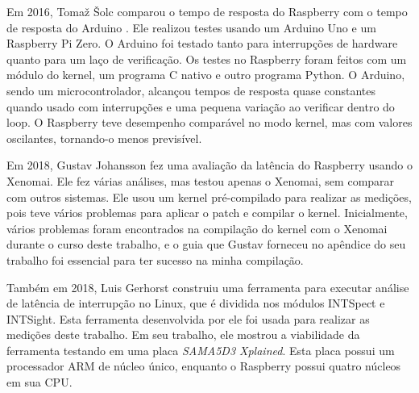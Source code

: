Em 2016, Tomaž Šolc comparou o tempo de resposta do Raspberry com o tempo de resposta do Arduino \cite{Solc2016}. Ele realizou testes usando um Arduino Uno e um Raspberry Pi Zero. O Arduino foi testado tanto para interrupções de hardware quanto para um laço de verificação. Os testes no Raspberry foram feitos com um módulo do kernel, um programa C nativo e outro programa Python. O Arduino, sendo um microcontrolador, alcançou tempos de resposta quase constantes quando usado com interrupções e uma pequena variação ao verificar dentro do loop. O Raspberry teve desempenho comparável no modo kernel, mas com valores oscilantes, tornando-o menos previsível.

Em 2018, Gustav Johansson \cite{Johansson2018} fez uma avaliação da latência do Raspberry usando o Xenomai. Ele fez várias análises, mas testou apenas o Xenomai, sem comparar com outros sistemas. Ele usou um kernel pré-compilado para realizar as medições, pois teve vários problemas para aplicar o patch e compilar o kernel. Inicialmente, vários problemas foram encontrados na compilação do kernel com o Xenomai durante o curso deste trabalho, e o guia que Gustav forneceu no apêndice do seu trabalho foi essencial para ter sucesso na minha compilação.

Também em 2018, Luis Gerhorst \cite{Gerhorst2018} construiu uma ferramenta para executar análise de latência de interrupção no Linux, que é dividida nos módulos INTSpect e INTSight. Esta ferramenta desenvolvida por ele foi usada para realizar as medições deste trabalho. Em seu trabalho, ele mostrou a viabilidade da ferramenta testando em uma placa \textit{SAMA5D3 Xplained}. Esta placa possui um processador ARM de núcleo único, enquanto o Raspberry possui quatro núcleos em sua CPU.

